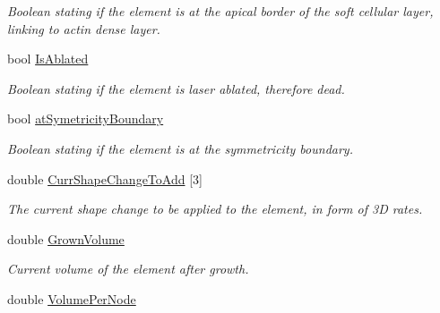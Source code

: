 \begin{DoxyCompactItemize}
\begin{DoxyCompactList}\small\item\em Boolean stating if the element is at the apical border of the soft cellular layer, linking to actin dense layer. \end{DoxyCompactList}\item 
\hypertarget{classShapeBase_a4f09d39d079bfe95ea7c25f5d3de6c09}{}bool \hyperlink{classShapeBase_a4f09d39d079bfe95ea7c25f5d3de6c09}{Is\+Ablated}\label{classShapeBase_a4f09d39d079bfe95ea7c25f5d3de6c09}

\begin{DoxyCompactList}\small\item\em Boolean stating if the element is laser ablated, therefore dead. \end{DoxyCompactList}\item 
\hypertarget{classShapeBase_a3d15f14d23230682242ed063872617af}{}bool \hyperlink{classShapeBase_a3d15f14d23230682242ed063872617af}{at\+Symetricity\+Boundary}\label{classShapeBase_a3d15f14d23230682242ed063872617af}

\begin{DoxyCompactList}\small\item\em Boolean stating if the element is at the symmetricity boundary. \end{DoxyCompactList}\item 
\hypertarget{classShapeBase_a3d48903871978d77a77cb77f569975c0}{}double \hyperlink{classShapeBase_a3d48903871978d77a77cb77f569975c0}{Curr\+Shape\+Change\+To\+Add} \mbox{[}3\mbox{]}\label{classShapeBase_a3d48903871978d77a77cb77f569975c0}

\begin{DoxyCompactList}\small\item\em The current shape change to be applied to the element, in form of 3\+D rates. \end{DoxyCompactList}\item 
\hypertarget{classShapeBase_a8a1bafcaf21f040dd137abfe434a75a9}{}double \hyperlink{classShapeBase_a8a1bafcaf21f040dd137abfe434a75a9}{Grown\+Volume}\label{classShapeBase_a8a1bafcaf21f040dd137abfe434a75a9}

\begin{DoxyCompactList}\small\item\em Current volume of the element after growth. \end{DoxyCompactList}\item 
\hypertarget{classShapeBase_a59943ecb9f8ec139c0f564c1fb91d876}{}double \hyperlink{classShapeBase_a59943ecb9f8ec139c0f564c1fb91d876}{Volume\+Per\+Node}\label{classShapeBase_a59943ecb9f8ec139c0f564c1fb91d876}


\end{DoxyCompactItemize}

